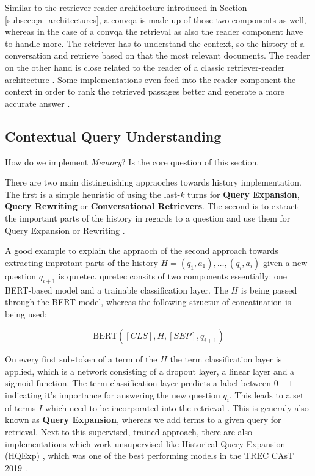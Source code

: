 Similar to the retriever-reader architecture introduced in Section \ref{subsec:qa_architectures}, a \gls{convqa} is made up of those two components as well, whereas in the case of a \gls{convqa} the retrieval as also the reader component have to handle more. The retriever has to understand the context, so the history of a conversation and retrieve based on that the most relevant documents. The reader on the other hand is close related to the reader of a classic retriever-reader architecture \cite{zamani_conversational_2023,gao_neural_2022}. Some implementations even feed into the reader component the context in order to rank the retrieved passages better and generate a more accurate answer \cite{owoicho_trec_2022}.

\subsection{Contextual Query Understanding}
\label{subsec:cqa_contextual_query_understanding}

How do we implement \textit{Memory}? Is the core question of this section. 

There are two main distinguishing appraoches towards history implementation. The first is a simple heuristic of using the last-$k$ turns for \textbf{Query Expansion}, \textbf{Query Rewriting} or \textbf{Conversational Retrievers}. The second is to extract the important parts of the history in regards to a question and use them for Query Expansion or Rewriting \cite{gao_neural_2022}.

A good example to explain the appraoch of the second approach towards extracting improtant parts of the history $H = {(q_1, a_1), \dots , (q_i, a_i)}$ given a new question $q_{i+1}$ is \gls{quretec}\cite{voskarides_query_2020}. \gls{quretec} consits of two components essentially: one BERT-based model and a trainable classification layer. The $H$ is being passed through the BERT model, whereas the following structur of concatination is being used: 

\begin{equation}
    \text{BERT}([CLS],H,[SEP],q_{i+1}) 
\end{equation}

On every first sub-token of a term of the $H$ the term classification layer is applied, which is a network consisting of a dropout layer, a linear layer and a sigmoid function. The term classification layer predicts a label between $0-1$ indicating it's importance for answering the new question $q_i$. This leads to a set of terms $I$ which need to be incorporated into the retrieval \cite{voskarides_query_2020}. This is generaly also known as \textbf{Query Expansion}, whereas we add terms to a given query for retrieval. Next to this supervised, trained approach, there are also implementations which work unsupervised like Historical Query Expansion (HQExp) \cite{yang_query_2019}, which was one of the best performing models in the TREC CAsT 2019 \cite{dalton_trec_2020}.

